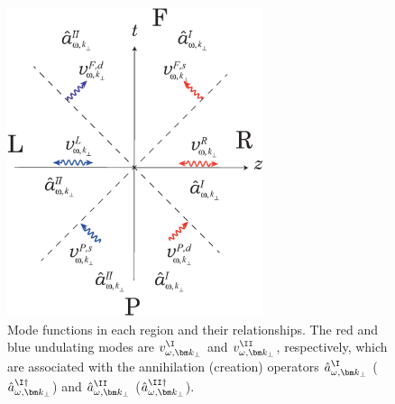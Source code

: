 \documentclass[aps,prd,preprintnumbers,nofootinbib,showpacs]{revtex4}%
\begin{document}
\begin{widetext}
\begin{figure}[t]
\begin{center}
    \includegraphics[width=7.5cm]{fig3.eps}
\caption{Mode functions in each region and their relationships. 
The red and blue undulating modes are 
$v^\I_{\omega,\bm k_\perp}$ and $v^\II_{\omega,\bm k_\perp}$, respectively, 
which are associated with the annihilation (creation) operators 
$\hat a^\I_{\omega,\bm k_\perp}$ ($\hat a^{\I\dagger}_{\omega,\bm k_\perp}$) 
and $\hat a^{\II}_{\omega,\bm k_\perp}$ ($\hat a^{\II\dagger}_{\omega,\bm k_\perp}$). 
\label{fig:coordinate4}
}
\end{center}
\end{figure}





\end{widetext}
\end{document}
